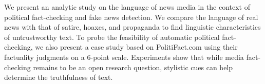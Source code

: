 We present an analytic study on the language of news media in the context of political fact-checking and fake news detection. We compare the language of real news with that of satire, hoaxes, and propaganda to find linguistic characteristics of untrustworthy text. To probe the feasibility of automatic political fact-checking, we also present a case study based on PolitiFact.com using their factuality judgments on a 6-point scale. Experiments show that while media fact-checking remains to be an open research question, stylistic cues can help determine the truthfulness of text.
